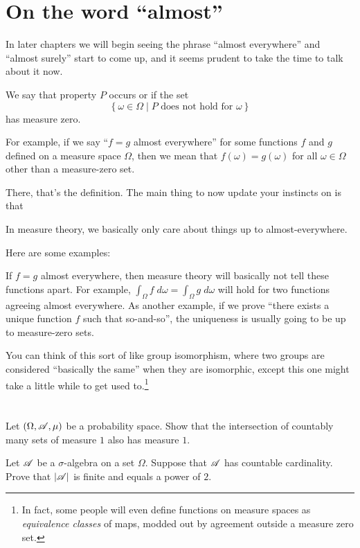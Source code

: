 \section{On the word ``almost''}
In later chapters we will begin seeing the phrase ``almost everywhere''
and ``almost surely'' start to come up,
and it seems prudent to take the time to talk about it now.

\begin{definition}
	We say that property $P$ occurs
	 or  if the set
	\[ \left\{ \omega \in \Omega \mid \text{$P$ does not hold for $\omega$} \right\} \]
	has measure zero.
\end{definition}

For example, if we say ``$f = g$ almost everywhere''
for some functions $f$ and $g$ defined on a measure space $\Omega$,
then we mean that $f(\omega) = g(\omega)$ for all $\omega \in \Omega$
other than a measure-zero set.

There, that's the definition.
The main thing to now update your instincts on is that
\begin{moral}
	In measure theory,
	we basically only care about things up to almost-everywhere.
\end{moral}
Here are some examples:
\begin{itemize}
	\ii If $f=g$ almost everywhere,
	then measure theory will basically not tell these functions apart.
	For example, $\int_\Omega f \; d\omega = \int_\Omega g \; d\omega$
	will hold for two functions agreeing almost everywhere.
	\ii As another example,
	if we prove ``there exists a unique function $f$ such that so-and-so'',
	the uniqueness is usually going to be up to measure-zero sets.
\end{itemize}
You can think of this sort of like group isomorphism,
where two groups are considered ``basically the same'' when they are isomorphic,
except this one might take a little while to get used to.\footnote{In fact,
	some people will even define functions on measure spaces
	as \emph{equivalence classes} of maps,
	modded out by agreement outside a measure zero set.}

\section{\problemhead}
\begin{dproblem}
	Let $(\Omega, \mathscr A, \mu)$ be a probability space.
	Show that the intersection of countably many sets of measure $1$
	also has measure $1$.
\end{dproblem}

\begin{problem}
	\gim
	Let $\mathscr A$ be a $\sigma$-algebra on a set $\Omega$.
	Suppose that $\mathscr A$ has countable cardinality.
	Prove that $|\mathscr A|$ is finite and equals a power of $2$.
\end{problem}
